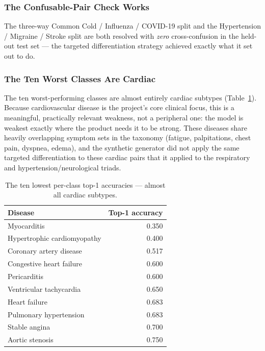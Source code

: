 \documentclass[12pt,a4paper]{report}
\begin{document}
\subsubsection{The Confusable-Pair Check Works}

The three-way Common Cold / Influenza / COVID-19 split and the Hypertension /
Migraine / Stroke split are both resolved with \emph{zero} cross-confusion in
the held-out test set --- the targeted differentiation strategy achieved exactly
what it set out to do.

\subsubsection{The Ten Worst Classes Are Cardiac}

The ten worst-performing classes are almost entirely cardiac subtypes
(Table~\ref{tab:worstclasses}). Because cardiovascular disease is the project's
core clinical focus, this is a meaningful, practically relevant weakness, not a
peripheral one: the model is weakest exactly where the product needs it to be
strong. These diseases share heavily overlapping symptom sets in the taxonomy
(fatigue, palpitations, chest pain, dyspnea, edema), and the synthetic
generator did not apply the same targeted differentiation to these cardiac pairs
that it applied to the respiratory and hypertension/neurological triads.

\begin{table}[H]
\centering
\caption{The ten lowest per-class top-1 accuracies --- almost all cardiac
subtypes.}
\label{tab:worstclasses}
\small
\begin{tabular}{@{}lr@{}}
\toprule
\textbf{Disease} & \textbf{Top-1 accuracy} \\
\midrule
Myocarditis & 0.350 \\
Hypertrophic cardiomyopathy & 0.400 \\
Coronary artery disease & 0.517 \\
Congestive heart failure & 0.600 \\
Pericarditis & 0.600 \\
Ventricular tachycardia & 0.650 \\
Heart failure & 0.683 \\
Pulmonary hypertension & 0.683 \\
Stable angina & 0.700 \\
Aortic stenosis & 0.750 \\
\bottomrule
\end{tabular}
\end{table}
\end{document}
